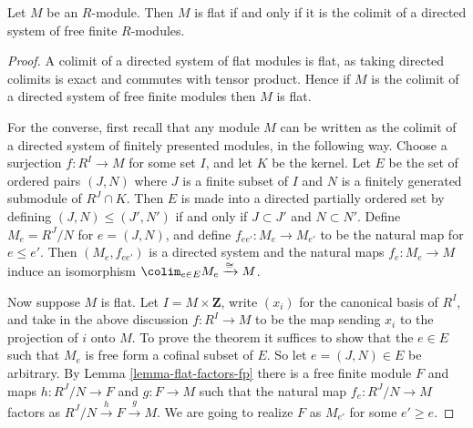 %
\begin{theorem}
\label{theorem-lazard}
Let $M$ be an $R$-module.  Then $M$ is flat if and only if it is the colimit of
a directed system of free finite $R$-modules.
\end{theorem}

\begin{proof}
A colimit of a directed system of flat modules is flat, as taking directed
colimits is exact and commutes with tensor product. Hence if $M$ is the colimit
of a directed system of free finite modules then $M$ is flat.

\medskip\noindent
For the converse, first recall that any module $M$ can be written as the
colimit of a directed system of finitely presented modules, in the following
way.  Choose a surjection $f: R^I \to M$ for some set $I$, and let $K$
be the kernel.  Let $E$ be the set of ordered pairs $(J, N)$ where $J$ is a
finite subset of $I$ and $N$ is a finitely generated submodule of $R^J \cap K$.
Then $E$ is made into a directed partially ordered set by defining $(J, N) \leq
(J', N')$ if and only if $J \subset J'$ and $N \subset N'$.  Define $M_e =
R^J/N$ for $e = (J, N)$, and define $f_{ee'}: M_e \to M_{e'}$ to be
the natural map for $e \leq e'$.  Then $(M_e, f_{ee'})$ is a directed system and
the natural maps $f_e: M_e \to M$ induce an isomorphism
$\colim_{e
\in E} M_e \xrightarrow{\cong} M$.

\medskip\noindent
Now suppose $M$ is flat.  Let $I = M \times \mathbf{Z}$, write $(x_i)$ for
the canonical basis of $R^{I}$, and take in the above discussion $f: R^I
\to M$ to be the map sending $x_i$ to the projection of $i$ onto $M$.
To prove the theorem it suffices to show that the $e \in E$ such that $M_e$
is free form a cofinal subset of $E$.  So let $e = (J, N) \in E$ be arbitrary.
By Lemma \ref{lemma-flat-factors-fp} there is a free finite module $F$ and maps
$h: R^J/N \to F$ and $g: F \to M$ such that the natural map
$f_e: R^J/N \to M$ factors as $R^J/N \xrightarrow{h} F
\xrightarrow{g} M$.  We are going to realize $F$ as $M_{e'}$ for some $e' \geq
e$.


\end{proof}
